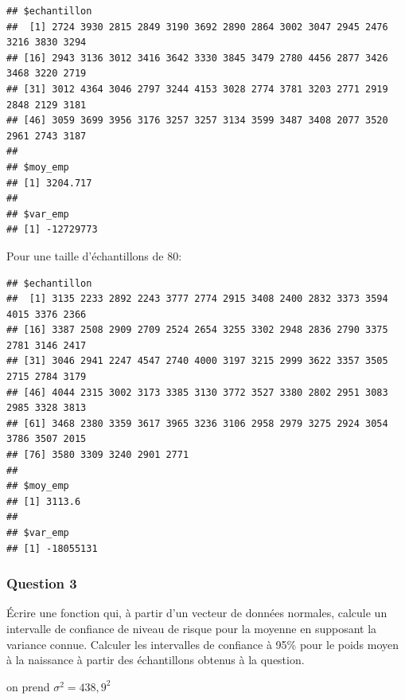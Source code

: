 \documentclass[
]{article}
\newenvironment{Shaded}{\begin{snugshade}}{\end{snugshade}}
\newcommand{\DecValTok}[1]{\textcolor[rgb]{0.00,0.00,0.81}{#1}}
\newcommand{\FunctionTok}[1]{\textcolor[rgb]{0.00,0.00,0.00}{#1}}
\newcommand{\NormalTok}[1]{#1}
\newcommand{\OtherTok}[1]{\textcolor[rgb]{0.56,0.35,0.01}{#1}}
\newcommand{\SpecialCharTok}[1]{\textcolor[rgb]{0.00,0.00,0.00}{#1}}
\begin{document}
\begin{verbatim}
## $echantillon
##  [1] 2724 3930 2815 2849 3190 3692 2890 2864 3002 3047 2945 2476 3216 3830 3294
## [16] 2943 3136 3012 3416 3642 3330 3845 3479 2780 4456 2877 3426 3468 3220 2719
## [31] 3012 4364 3046 2797 3244 4153 3028 2774 3781 3203 2771 2919 2848 2129 3181
## [46] 3059 3699 3956 3176 3257 3257 3134 3599 3487 3408 2077 3520 2961 2743 3187
## 
## $moy_emp
## [1] 3204.717
## 
## $var_emp
## [1] -12729773
\end{verbatim}

Pour une taille d'échantillons de 80:

\begin{Shaded}
\end{Shaded}

\begin{verbatim}
## $echantillon
##  [1] 3135 2233 2892 2243 3777 2774 2915 3408 2400 2832 3373 3594 4015 3376 2366
## [16] 3387 2508 2909 2709 2524 2654 3255 3302 2948 2836 2790 3375 2781 3146 2417
## [31] 3046 2941 2247 4547 2740 4000 3197 3215 2999 3622 3357 3505 2715 2784 3179
## [46] 4044 2315 3002 3173 3385 3130 3772 3527 3380 2802 2951 3083 2985 3328 3813
## [61] 3468 2380 3359 3617 3965 3236 3106 2958 2979 3275 2924 3054 3786 3507 2015
## [76] 3580 3309 3240 2901 2771
## 
## $moy_emp
## [1] 3113.6
## 
## $var_emp
## [1] -18055131
\end{verbatim}

\hypertarget{question-3}{%
\subsubsection{Question 3}\label{question-3}}

Écrire une fonction qui, à partir d'un vecteur de données normales,
calcule un intervalle de confiance de niveau de risque pour la moyenne
en supposant la variance connue. Calculer les intervalles de confiance à
95\% pour le poids moyen à la naissance à partir des échantillons
obtenus à la question.

on prend \(\sigma^2=438,9^2\)
\end{document}
